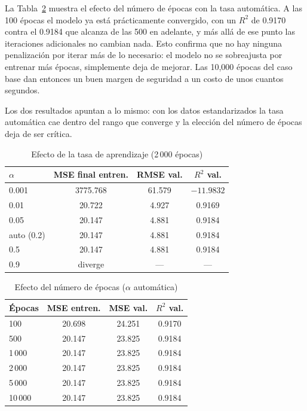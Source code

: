 \documentclass[conference]{IEEEtran}
\begin{document}
La Tabla~\ref{tab:epocas} muestra el efecto del número de épocas con la tasa automática. A las 100 épocas el modelo ya está prácticamente convergido, con un $R^2$ de 0.9170 contra el 0.9184 que alcanza de las 500 en adelante, y más allá de ese punto las iteraciones adicionales no cambian nada. Esto confirma que no hay ninguna penalización por iterar más de lo necesario: el modelo no se sobreajusta por entrenar más épocas, simplemente deja de mejorar. Las 10,000 épocas del caso base dan entonces un buen margen de seguridad a un costo de unos cuantos segundos.

Los dos resultados apuntan a lo mismo: con los datos estandarizados la tasa automática cae dentro del rango que converge y la elección del número de épocas deja de ser crítica.

\begin{table}[htbp]
\caption{Efecto de la tasa de aprendizaje (2\,000 épocas)}
\label{tab:lr}
\centering
\begin{tabular}{lccc}
\toprule
$\alpha$ & MSE final entren. & RMSE val. & $R^2$ val. \\
\midrule
0.001 & 3775.768 & 61.579 & $-11.9832$ \\
0.01 & 20.722 & 4.927 & 0.9169 \\
0.05 & 20.147 & 4.881 & 0.9184 \\
auto (0.2) & 20.147 & 4.881 & 0.9184 \\
0.5 & 20.147 & 4.881 & 0.9184 \\
0.9 & diverge & --- & --- \\
\bottomrule
\end{tabular}
\end{table}

\begin{table}[htbp]
\caption{Efecto del número de épocas ($\alpha$ automática)}
\label{tab:epocas}
\centering
\begin{tabular}{lccc}
\toprule
Épocas & MSE entren. & MSE val. & $R^2$ val. \\
\midrule
100 & 20.698 & 24.251 & 0.9170 \\
500 & 20.147 & 23.825 & 0.9184 \\
1\,000 & 20.147 & 23.825 & 0.9184 \\
2\,000 & 20.147 & 23.825 & 0.9184 \\
5\,000 & 20.147 & 23.825 & 0.9184 \\
10\,000 & 20.147 & 23.825 & 0.9184 \\
\bottomrule
\end{tabular}
\end{table}
\end{document}
